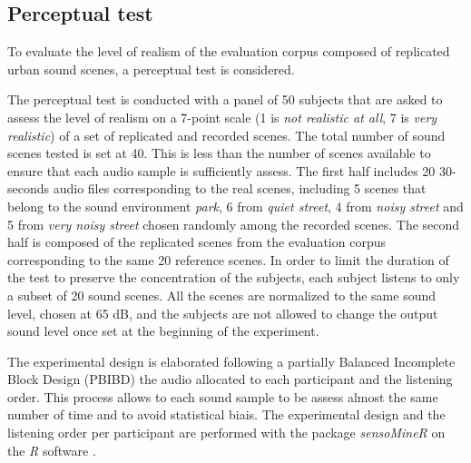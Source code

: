 \documentclass[review,5p,twocolumn,sort&compress,times]{elsarticle}
\begin{document}
\subsection{Perceptual test}

To evaluate the level of realism of the evaluation corpus composed of replicated urban sound scenes, a perceptual test is considered.

The perceptual test is conducted with a panel of 50 subjects that are asked to assess the level of realism on a 7-point scale (1 is \textit{not realistic at all}, 7 is \textit{very realistic}) of a set of replicated and recorded scenes. The total number of sound scenes tested is set at 40. This is less than the number of scenes available to ensure that each audio sample is sufficiently assess. The first half includes 20 30-seconds audio files corresponding to the real scenes, including 5 scenes that belong to the sound environment \textit{park}, 6 from \textit{quiet street}, 4 from \textit{noisy street} and 5 from \textit{very noisy street} chosen randomly among the recorded scenes. The second half is composed of the replicated scenes from the evaluation corpus corresponding to the same 20 reference scenes. In order to limit the duration of the test to preserve the concentration of the subjects, each subject listens to only a subset of 20 sound scenes. All the scenes are normalized to the same sound level, chosen at 65 dB, and the subjects are not allowed to change the output sound level once set at the beginning of the experiment.

The experimental design is elaborated following a partially Balanced Incomplete Block Design (PBIBD) \cite{john1977optimal} the audio allocated to each participant and the listening order. This process allows to each sound sample to be assess almost the same number of time and to avoid statistical biais. The experimental design and the listening order per participant are performed with the package \textit{sensoMineR} on the \textit{R} software \cite{le_sensominer:_2008}.\\
\end{document}
